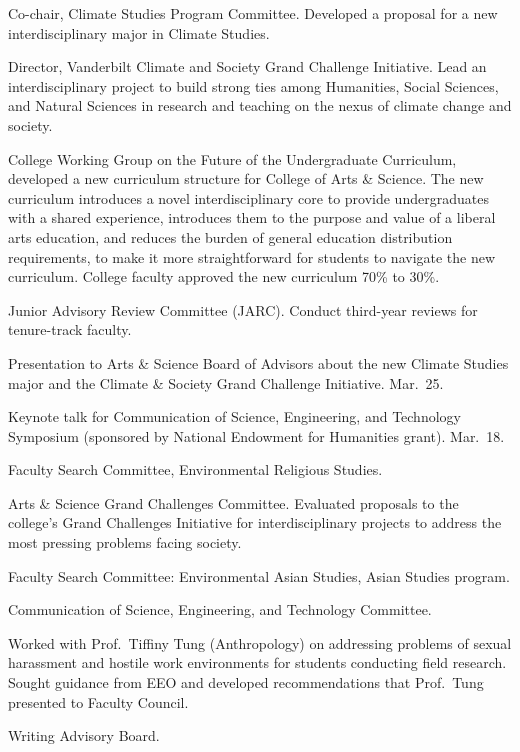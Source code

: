 \item[2021--present] Co-chair, Climate Studies Program Committee.
  Developed a proposal for a new interdisciplinary major in Climate Studies.
\item[2020--present] Director, Vanderbilt Climate and Society Grand Challenge
  Initiative. Lead an interdisciplinary project to build strong ties among
  Humanities, Social Sciences, and Natural Sciences in research and teaching on
  the nexus of climate change and society.
\item[2022--2023] College Working Group on the Future of the
  Undergraduate Curriculum,
  developed a new curriculum structure for College of Arts \& Science.
  The new curriculum introduces a novel interdisciplinary core to provide undergraduates with a shared experience, introduces them to the purpose and value of a liberal arts education, and reduces the burden of general education distribution requirements, to make it more straightforward for students to navigate the new curriculum.
  College faculty approved the new curriculum 70\% to 30\%.
\item[2020--2022] Junior Advisory Review Committee (JARC).
  Conduct third-year reviews for tenure-track faculty.
\item[2022] Presentation to Arts \& Science Board of Advisors about the new
  Climate Studies major and the Climate \& Society Grand Challenge Initiative.
  Mar.~25.
\item[2022] Keynote talk for Communication of Science, Engineering, and
  Technology Symposium (sponsored by National Endowment for Humanities grant).
  Mar.~18.
\item[2021--2022] Faculty Search Committee, Environmental Religious Studies.
\item[2019--2020] Arts \& Science Grand Challenges Committee.
  Evaluated proposals to the college's Grand Challenges Initiative for
  interdisciplinary projects to address the most pressing problems facing
  society.
\item[2019--2020] Faculty Search Committee: Environmental Asian Studies, Asian Studies program.
\item[2003--2018] Communication of Science, Engineering, and Technology Committee.
\item[2014--2015] Worked with Prof.\ Tiffiny Tung (Anthropology) on addressing problems of sexual harassment and hostile work environments for students conducting field research. Sought guidance from EEO and developed recommendations that Prof.\ Tung presented to Faculty Council.
\item[2004--2009] Writing Advisory Board.
